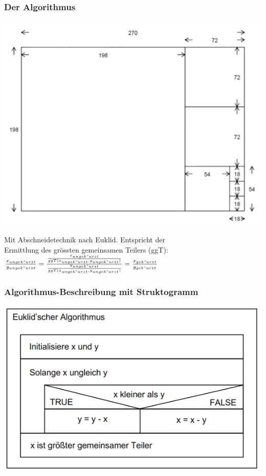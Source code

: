 		\begin{minipage}[t]{9 cm}
			\subsubsection{Der Algorithmus}
				\includegraphics[width=1.0\textwidth]{pics/Euklid.jpg}
							
				Mit Abschneidetechnik nach Euklid. Entspricht der \\
				Ermittlung des grössten gemeinsamen Teilers (ggT): \\
				$\frac{x_{ungek"urzt}}{y_{ungek"urzt}}=\frac{\frac{x_{ungek"urzt}}{ggT(x_{ungek"urzt},y_{ungek"urzt})}}{\frac{y_{ungek"urzt}}{ggT(x_{ungek"urzt},y_{ungek"urzt})}}=\frac{x_{gek"urzt}}{y_{gek"urzt}}$ \\
					
			\subsubsection{Algorithmus-Beschreibung mit Struktogramm }
				\includegraphics[width=1.0\textwidth]{pics/Euklid_Struktogramm.jpg}

		\end{minipage}
